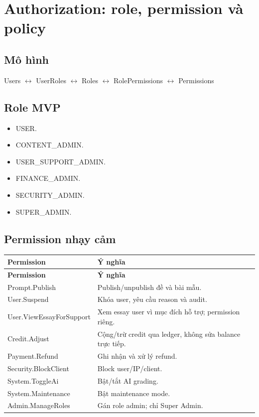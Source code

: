 \documentclass[11pt,a4paper]{article}
\begin{document}
\section{Authorization: role, permission và policy}

\subsection{Mô hình}
\begin{codebox}
Users $\leftrightarrow$ UserRoles $\leftrightarrow$ Roles $\leftrightarrow$ RolePermissions $\leftrightarrow$ Permissions
\end{codebox}

\subsection{Role MVP}
\begin{itemize}
  \item USER.
  \item CONTENT\_ADMIN.
  \item USER\_SUPPORT\_ADMIN.
  \item FINANCE\_ADMIN.
  \item SECURITY\_ADMIN.
  \item SUPER\_ADMIN.
\end{itemize}

\subsection{Permission nhạy cảm}
\begin{longtable}{|P{0.30\textwidth}|P{0.56\textwidth}|}
\hline
\textbf{Permission} & \textbf{Ý nghĩa} \\ \hline
\endfirsthead
\hline
\textbf{Permission} & \textbf{Ý nghĩa} \\ \hline
\endhead
Prompt.Publish & Publish/unpublish đề và bài mẫu. \\ \hline
User.Suspend & Khóa user, yêu cầu reason và audit. \\ \hline
User.ViewEssayForSupport & Xem essay user vì mục đích hỗ trợ; permission riêng. \\ \hline
Credit.Adjust & Cộng/trừ credit qua ledger, không sửa balance trực tiếp. \\ \hline
Payment.Refund & Ghi nhận và xử lý refund. \\ \hline
Security.BlockClient & Block user/IP/client. \\ \hline
System.ToggleAi & Bật/tắt AI grading. \\ \hline
System.Maintenance & Bật maintenance mode. \\ \hline
Admin.ManageRoles & Gán role admin; chỉ Super Admin. \\ \hline
\end{longtable}
\end{document}
